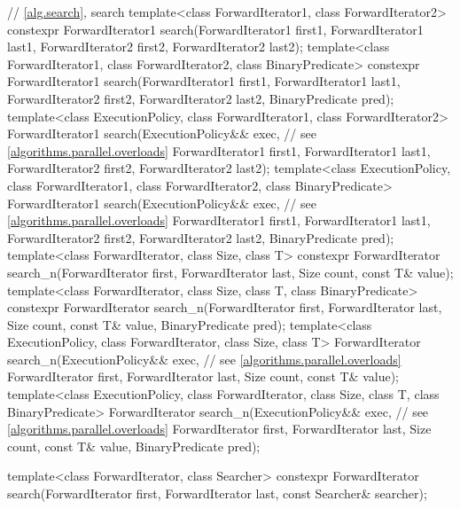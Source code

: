\begin{codeblock}
{  // \ref{alg.search}, search
  template<class ForwardIterator1, class ForwardIterator2>
    constexpr ForwardIterator1
      search(ForwardIterator1 first1, ForwardIterator1 last1,
             ForwardIterator2 first2, ForwardIterator2 last2);
  template<class ForwardIterator1, class ForwardIterator2, class BinaryPredicate>
    constexpr ForwardIterator1
      search(ForwardIterator1 first1, ForwardIterator1 last1,
             ForwardIterator2 first2, ForwardIterator2 last2,
             BinaryPredicate pred);
  template<class ExecutionPolicy, class ForwardIterator1, class ForwardIterator2>
    ForwardIterator1
      search(ExecutionPolicy&& exec, // see \ref{algorithms.parallel.overloads}
             ForwardIterator1 first1, ForwardIterator1 last1,
             ForwardIterator2 first2, ForwardIterator2 last2);
  template<class ExecutionPolicy, class ForwardIterator1, class ForwardIterator2,
           class BinaryPredicate>
    ForwardIterator1
      search(ExecutionPolicy&& exec, // see \ref{algorithms.parallel.overloads}
             ForwardIterator1 first1, ForwardIterator1 last1,
             ForwardIterator2 first2, ForwardIterator2 last2,
             BinaryPredicate pred);
  template<class ForwardIterator, class Size, class T>
    constexpr ForwardIterator
      search_n(ForwardIterator first, ForwardIterator last,
               Size count, const T& value);
  template<class ForwardIterator, class Size, class T, class BinaryPredicate>
    constexpr ForwardIterator
      search_n(ForwardIterator first, ForwardIterator last,
               Size count, const T& value,
               BinaryPredicate pred);
  template<class ExecutionPolicy, class ForwardIterator, class Size, class T>
    ForwardIterator
      search_n(ExecutionPolicy&& exec, // see \ref{algorithms.parallel.overloads}
               ForwardIterator first, ForwardIterator last,
               Size count, const T& value);
  template<class ExecutionPolicy, class ForwardIterator, class Size, class T,
           class BinaryPredicate>
    ForwardIterator
      search_n(ExecutionPolicy&& exec, // see \ref{algorithms.parallel.overloads}
               ForwardIterator first, ForwardIterator last,
               Size count, const T& value,
               BinaryPredicate pred);

  template<class ForwardIterator, class Searcher>
    constexpr ForwardIterator
      search(ForwardIterator first, ForwardIterator last, const Searcher& searcher);

}
\end{codeblock}
